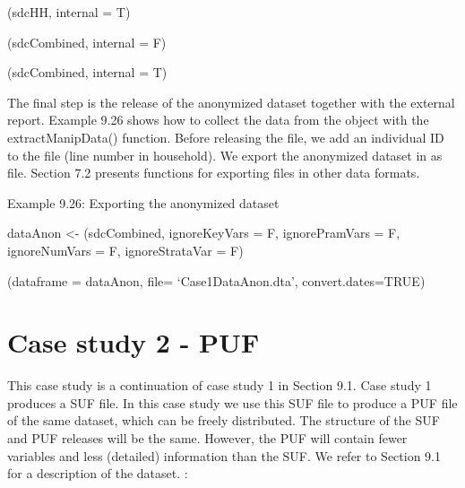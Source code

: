 \documentclass[letterpaper,10pt,english]{sphinxmanual}
\begin{document}
(sdcHH, internal = T) 

\begin{DUlineblock}{0em}
\item[] 
\item[] (sdcCombined, internal = F) 
\end{DUlineblock}

(sdcCombined, internal = T) 


The final step is the release of the anonymized dataset together with
the external report. Example 9.26 shows how to collect the data from the
 object with the extractManipData() function. Before releasing
the file, we add an individual ID to the file (line number in
household). We export the anonymized dataset in as  file. Section
7.2 presents functions for exporting files in other data formats.

Example 9.26: Exporting the anonymized dataset

\begin{DUlineblock}{0em}
\item[] 
\item[] 
\item[] dataAnon \textless{}- (sdcCombined, ignoreKeyVars = F,
ignorePramVars = F, ignoreNumVars = F, ignoreStrataVar = F) 
\end{DUlineblock}

\begin{DUlineblock}{0em}
\item[] 
\item[] (dataframe = dataAnon, file= ‘Case1DataAnon.dta’,
convert.dates=TRUE)
\end{DUlineblock}


\section{Case study 2 - PUF}
\label{\detokenize{case_studies:case-study-2-puf}}
This case study is a continuation of case study 1 in Section 9.1. Case
study 1 produces a SUF file. In this case study we use this SUF file to
produce a PUF file of the same dataset, which can be freely distributed.
The structure of the SUF and PUF releases will be the same. However, the
PUF will contain fewer variables and less (detailed) information than
the SUF. We refer to Section 9.1 for a description of the dataset.
: 
\end{document}
